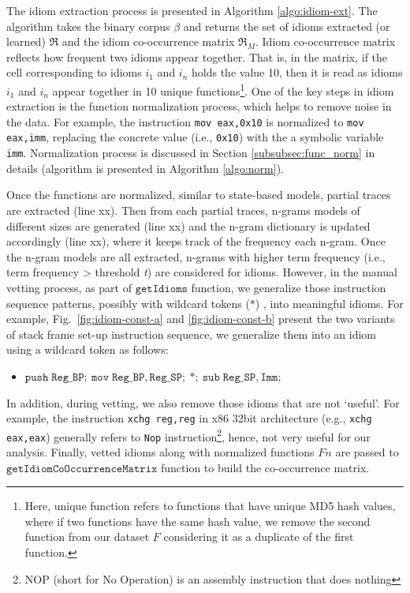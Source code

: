 The idiom extraction process is presented in Algorithm \ref{algo:idiom-ext}. The algorithm takes the binary corpus $\beta$ and returns the set of idioms extracted (or learned) $\Re$ and the idiom co-occurrence matrix $\Re_M$. Idiom co-occurrence matrix reflects how frequent two idioms appear together. That is, in the matrix, if the cell corresponding to idioms $i_1$ and $i_n$ holds the value 10, then it is read as idioms $i_1$ and $i_n$ appear together in 10 unique functions\footnote{Here, unique function refers to functions that have unique MD5 hash values, where if two functions have the same hash value, we remove the second function from our dataset $F$ considering it as a duplicate of the first function.}. One of the key steps in idiom extraction is the function normalization process, which helps to remove noise in the data. For example, the instruction \texttt{mov eax,0x10} is normalized to \texttt{mov eax,imm}, replacing the concrete value (i.e., \texttt{0x10}) with the a symbolic variable \texttt{imm}. Normalization process is discussed in Section \ref{subsubsec:func_norm} in details (algorithm is presented in Algorithm \ref{algo:norm}).

Once the functions are normalized, similar to state-based models, partial traces are extracted (line xx). Then from each partial traces, n-grams models of different sizes are generated (line xx) and the n-gram dictionary is updated accordingly (line xx), where it keeps track of the frequency each n-gram. Once the n-gram models are all extracted, n-grams with higher term frequency (i.e., term frequency > threshold \textit{t}) are considered for idioms. However, in the manual vetting process, as part of $\mathtt{getIdioms}$ function, we generalize those instruction sequence patterns, possibly with wildcard tokens ($\ast$) \cite{rosenblum2011recovering}, into meaningful idioms. For example, Fig.~\ref{fig:idiom-const-a} and \ref{fig:idiom-const-b} present the two variants of stack frame set-up instruction sequence, we generalize them into an idiom using a wildcard token as follows:
\begin{itemize}
  \item[]$\mathtt{push \;Reg\_BP; \: mov \; Reg\_BP, Reg\_SP; \: \ast ;\: sub \; Reg\_SP, Imm;}$
\end{itemize}
In addition, during vetting, we also remove those idioms that are not `useful'. For example, the instruction \texttt{xchg reg,reg} in x86 32bit architecture (e.g., \texttt{xchg eax,eax}) generally refers to \texttt{Nop} instruction\footnote{NOP (short for No Operation) is an assembly instruction that does nothing}, hence, not very useful for our analysis. Finally, vetted idioms along with normalized functions $Fn$ are passed to $\mathtt{getIdiomCoOccurrenceMatrix}$ function to build the co-occurrence matrix.

